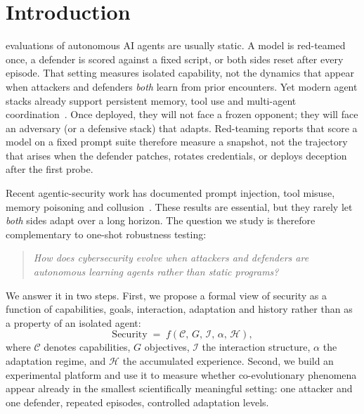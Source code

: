 \section{Introduction}
\label{sec:intro}

 evaluations of autonomous AI agents are
usually static. A model is red-teamed once, a defender is scored against
a fixed script, or both sides reset after every episode. That setting
measures isolated capability, not the dynamics that appear when
attackers and defenders \emph{both} learn from prior encounters. Yet
modern agent stacks already support persistent memory, tool use and
multi-agent coordination~\cite{park2023generative,wu2023autogen,xi2025rise,shinn2023reflexion}.
Once deployed, they will not face a frozen opponent; they will face an
adversary (or a defensive stack) that adapts. Red-teaming reports that
score a model on a fixed prompt suite therefore measure a snapshot, not
the trajectory that arises when the defender patches, rotates credentials,
or deploys deception after the first probe.

Recent agentic-security work has documented prompt injection, tool
misuse, memory poisoning and collusion~\cite{greshake2023not,debenedetti2024agentdojo,zhan2024injecagent,chen2024agentpoison,motwani2024secret}.
These results are essential, but they rarely let \emph{both} sides
adapt over a long horizon. The question we study is therefore
complementary to one-shot robustness testing:

\begin{quote}
\textit{How does cybersecurity evolve when attackers and defenders are
autonomous learning agents rather than static programs?}
\end{quote}

We answer it in two steps. First, we propose a formal view of security
as a function of capabilities, goals, interaction, adaptation and
history rather than as a property of an isolated agent:
\begin{equation}
  \mathrm{Security}
  \;=\;
  f\!\left(\mathcal{C},\, G,\, \mathcal{I},\, \alpha,\, \mathcal{H}\right),
  \label{eq:security-fn}
\end{equation}
where $\mathcal{C}$ denotes capabilities, $G$ objectives, $\mathcal{I}$
the interaction structure, $\alpha$ the adaptation regime, and $\mathcal{H}$
the accumulated experience. Second, we build an experimental platform and
use it to measure whether co-evolutionary phenomena appear already in
the smallest scientifically meaningful setting: one attacker and one
defender, repeated episodes, controlled adaptation levels.

